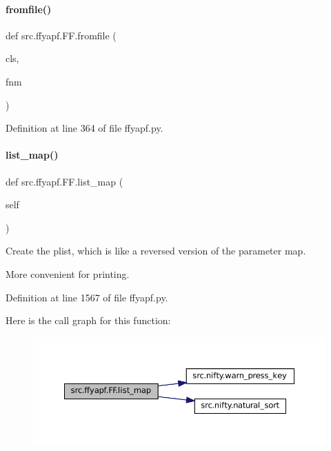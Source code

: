 \paragraph{\texorpdfstring{fromfile()}{fromfile()}}
{\footnotesize\ttfamily def src.\+ffyapf.\+F\+F.\+fromfile (\begin{DoxyParamCaption}\item[{}]{cls,  }\item[{}]{fnm }\end{DoxyParamCaption})}



Definition at line 364 of file ffyapf.\+py.

\mbox{\label{classsrc_1_1ffyapf_1_1FF_a9efa0ddaab2f43cd5f0d2de090fc9f2e}} 
\paragraph{\texorpdfstring{list\+\_\+map()}{list\_map()}}
{\footnotesize\ttfamily def src.\+ffyapf.\+F\+F.\+list\+\_\+map (\begin{DoxyParamCaption}\item[{}]{self }\end{DoxyParamCaption})}



Create the plist, which is like a reversed version of the parameter map. 

More convenient for printing. 

Definition at line 1567 of file ffyapf.\+py.

Here is the call graph for this function\+:
\nopagebreak
\begin{figure}[H]
\begin{center}
\leavevmode
\includegraphics[width=350pt]{classsrc_1_1ffyapf_1_1FF_a9efa0ddaab2f43cd5f0d2de090fc9f2e_cgraph}
\end{center}
\end{figure}
\mbox{\label{classsrc_1_1ffyapf_1_1FF_a18a97385107b6be7f56315516208bb68}} 

